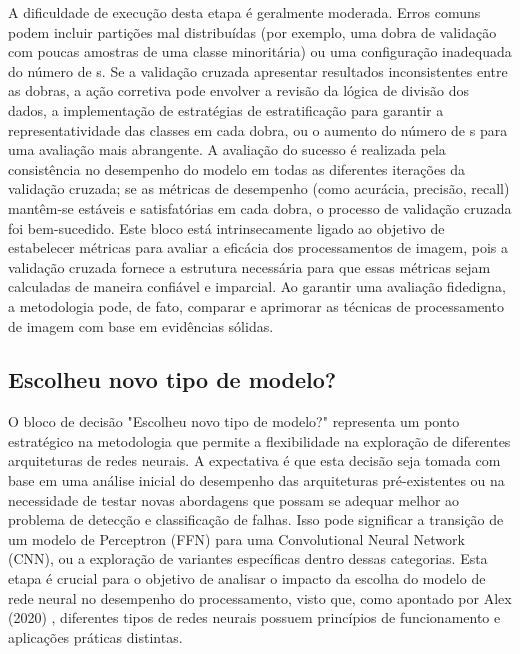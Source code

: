 A dificuldade de execução desta etapa é geralmente moderada. Erros comuns podem incluir partições mal distribuídas (por exemplo, uma dobra de validação com poucas amostras de uma classe minoritária) ou uma configuração inadequada do número de s. Se a validação cruzada apresentar resultados inconsistentes entre as dobras, a ação corretiva pode envolver a revisão da lógica de divisão dos dados, a implementação de estratégias de estratificação para garantir a representatividade das classes em cada dobra, ou o aumento do número de s para uma avaliação mais abrangente. A avaliação do sucesso é realizada pela consistência no desempenho do modelo em todas as diferentes iterações da validação cruzada; se as métricas de desempenho (como acurácia, precisão, recall) mantêm-se estáveis e satisfatórias em cada dobra, o processo de validação cruzada foi bem-sucedido. Este bloco está intrinsecamente ligado ao objetivo de estabelecer métricas para avaliar a eficácia dos processamentos de imagem, pois a validação cruzada fornece a estrutura necessária para que essas métricas sejam calculadas de maneira confiável e imparcial. Ao garantir uma avaliação fidedigna, a metodologia pode, de fato, comparar e aprimorar as técnicas de processamento de imagem com base em evidências sólidas.

\subsection{Escolheu novo tipo de modelo?}
O bloco de decisão "Escolheu novo tipo de modelo?" representa um ponto estratégico na metodologia que permite a flexibilidade na exploração de diferentes arquiteturas de redes neurais. A expectativa é que esta decisão seja tomada com base em uma análise inicial do desempenho das arquiteturas pré-existentes ou na necessidade de testar novas abordagens que possam se adequar melhor ao problema de detecção e classificação de falhas. Isso pode significar a transição de um modelo de Perceptron (FFN) para uma Convolutional Neural Network (CNN), ou a exploração de variantes específicas dentro dessas categorias. Esta etapa é crucial para o objetivo de analisar o impacto da escolha do modelo de rede neural no desempenho do processamento, visto que, como apontado por Alex (2020) \cite{alex2020}, diferentes tipos de redes neurais possuem princípios de funcionamento e aplicações práticas distintas.

